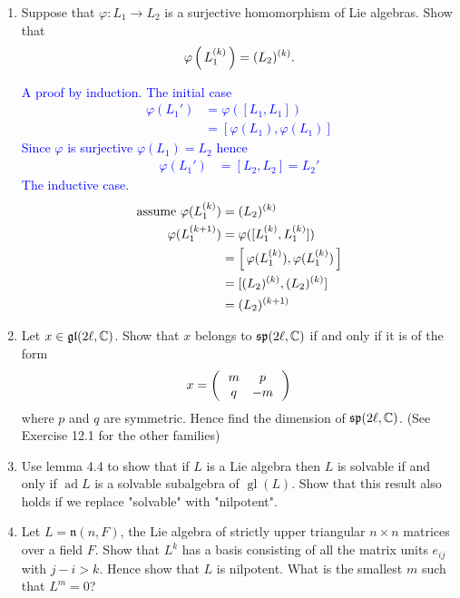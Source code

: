 \documentclass[12pt,a4paper]{report}
\newcommand{\BLUE}[1]{\textcolor{blue}{#1}}
\newcommand{\GL}{\operatorname{gl}}
\newcommand{\AD}{\operatorname{ad}}
\begin{document}
\newcommand{\PPP}[1]{^{(#1)}}
\begin{enumerate}[label=4.\arabic*]

\item  Suppose that $\varphi:L_1 \to L_2$ is a surjective homomorphism of Lie algebras.  Show that 
\begin{align*}
	\varphi\PAREN{L_1\PPP{k}}=(L_2)\PPP{k}.
\end{align*}

\BLUE{A proof by induction.  The initial case\begin{align*}
	\varphi(L_1') &= \varphi([L_1,L_1]) \\
	&= [\varphi(L_1),\varphi(L_1)]
\end{align*}Since $\varphi$ is surjective $\varphi(L_1)=L_2$ hence
\begin{align*}
	\varphi(L_1') &= [L_2,L_2] = L_2'
\end{align*}The inductive case.
\begin{align*}
	\text{assume } \varphi(L_1\PPP{k}) &= (L_2)\PPP{k} \\
	\varphi(L_1\PPP{k+1}) &= \varphi([L_1\PPP{k},L_1\PPP{k}]) \\
	&= \SQBRACKET{\varphi(L_1\PPP{k}),\varphi(L_1\PPP{k})} \\
	&= [ (L_2)\PPP{k}, (L_2)\PPP{k}] \\
	&= (L_2)\PPP{k+1}
\end{align*}
}

\item Let $x \in \mathfrak{gl}(2\ell, \mathbb{C})$.  Show that $x$ belongs to $\mathfrak{sp}(2\ell,\mathbb{C})$ if and only if it is of the form 
\begin{align*}
	x = \left (\,  \begin{array}{c c} m&p \\ q & -m \end{array}  \,\right )
\end{align*}where $p$ and $q$ are symmetric.  Hence find the dimension of $\mathfrak{sp}(2\ell, \mathbb{C})$.  (See Exercise 12.1 for the other families)

\item Use lemma 4.4 to show that if $L$ is a Lie algebra then $L$ is solvable if and only if $\AD L$ is a solvable subalgebra of $\GL(L)$.  Show that this result also holds if we replace "solvable" with "nilpotent".

\item Let $L=\mathfrak{n}(n,F)$, the Lie algebra of strictly upper triangular $n \times n$ matrices over a field $F$.  Show that $L^k$ has a basis consisting of all the matrix units $e_{ij}$ with $j-i>k$. Hence show that $L$ is nilpotent.  What is the smallest $m$ such that $L^m = 0$?


\end{enumerate}
\end{document}
